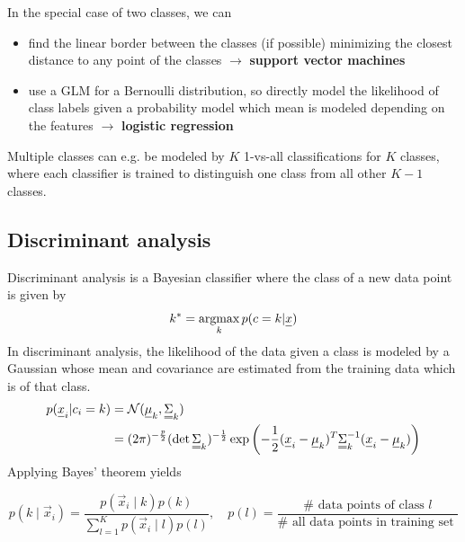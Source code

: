 In the special case of two classes, we can
\begin{itemize}
    \item find the linear border between the classes (if possible) minimizing the closest distance to any point of the classes $\rightarrow$ \textbf{support vector machines}
    \item use a GLM for a Bernoulli distribution, so directly model the likelihood of class labels given a probability
    model which mean is modeled depending on the features $\rightarrow$ \textbf{logistic regression}
\end{itemize}

Multiple classes can e.g. be modeled by $K$ 1-vs-all classifications for $K$ classes,
where each classifier is trained to distinguish one class from all other $K-1$ classes.


\subsection{Discriminant analysis}
Discriminant analysis is a Bayesian classifier where the class of a new data point is given by
\begin{equation}
    k^* = \argmax_k p(c = k | \vec{x})
\end{equation}
In discriminant analysis, the likelihood of the data given a class is modeled by a Gaussian whose mean
and covariance are estimated from the training data which is of that class.
\begin{equation}
    \begin{aligned}
        p(\vec{x}_i | c_i = k) &= \mathcal{N}(\vec{\mu}_k, \mat{\Sigma}_k) \\
                               &= (2\pi)^{-\frac{p}{2}} (\det \mat{\Sigma}_k)^{-\frac{1}{2}} \exp \left( -\frac{1}{2} (\vec{x}_i - \vec{\mu}_k)^T \mat{\Sigma}_k^{-1} (\vec{x}_i - \vec{\mu}_k) \right)
    \end{aligned}
\end{equation}
Applying Bayes' theorem yields

\begin{equation}
    p\left(k \mid \vec{x}_i\right)=\frac{p\left(\vec{x}_i \mid k\right) p(k)}{\sum_{l=1}^K p\left(\vec{x}_i \mid l\right) p(l)}, \quad p(l)=\frac{\# \text { data points of class } l}{\# \text { all data points in training set }}
\end{equation}

